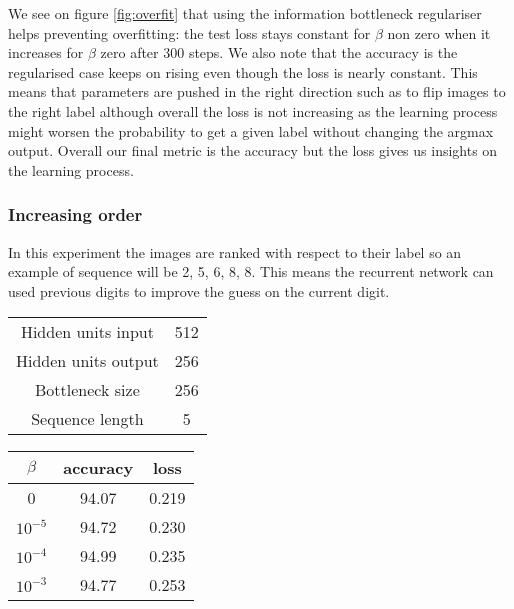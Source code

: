 \documentclass[11pt,oneside,openright]{report}
\begin{document}
We see on figure \ref{fig:overfit} that using the information bottleneck regulariser helps preventing overfitting: the test loss stays constant for $\beta$ non zero when it increases for $\beta$ zero after 300 steps. We also note that the accuracy is the regularised case keeps on rising even though the loss is nearly constant. This means that parameters are pushed in the right direction such as to flip images to the right label although overall the loss is not increasing as the learning process might worsen the probability to get a given label without changing the argmax output. Overall our final metric is the accuracy but the loss gives us insights on the learning process.

\subsubsection{Increasing order}
In this experiment the images are ranked with respect to their label so an example of sequence will be 2, 5, 6, 8, 8. This means the recurrent network can used previous digits to improve the guess on the current digit.

\begin{minipage}{0.35\textwidth}
        \centering
\begin{tabular}{ c | c  }
 Hidden units input & 512 \\
 Hidden units output & 256 \\
 Bottleneck size & 256 \\
 Sequence length & 5 \\
\end{tabular}
    \end{minipage}\hfill
    \begin{minipage}{0.8\textwidth}
        \centering
\begin{tabular}{ c | c c }
 $\beta$ & accuracy & loss \\
 \hline
0  & 94.07 & 0.219 \\
$10^{-5}$  & 94.72 & 0.230 \\
$10^{-4}$  & 94.99 & 0.235 \\
$10^{-3}$  & 94.77 & 0.253 \\
\end{tabular}
    \end{minipage}

\begin{center}
\end{center}
\end{document}
